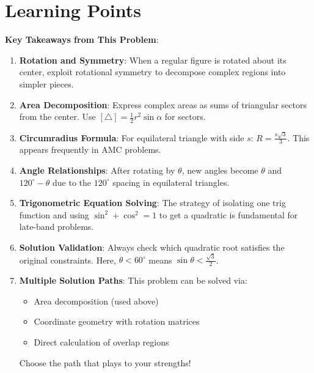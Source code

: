 \documentclass[12pt]{article}
\begin{document}
\section*{Learning Points}

\textbf{Key Takeaways from This Problem}:

\begin{enumerate}
    \item \textbf{Rotation and Symmetry}: When a regular figure is rotated about its center, exploit rotational symmetry to decompose complex regions into simpler pieces.
    
    \item \textbf{Area Decomposition}: Express complex areas as sums of triangular sectors from the center. Use $[\triangle] = \frac{1}{2}r^2\sin\alpha$ for sectors.
    
    \item \textbf{Circumradius Formula}: For equilateral triangle with side $s$: $R = \frac{s\sqrt{3}}{3}$. This appears frequently in AMC problems.
    
    \item \textbf{Angle Relationships}: After rotating by $\theta$, new angles become $\theta$ and $120^{\circ} - \theta$ due to the $120^{\circ}$ spacing in equilateral triangles.
    
    \item \textbf{Trigonometric Equation Solving}: The strategy of isolating one trig function and using $\sin^2 + \cos^2 = 1$ to get a quadratic is fundamental for late-band problems.
    
    \item \textbf{Solution Validation}: Always check which quadratic root satisfies the original constraints. Here, $\theta < 60^{\circ}$ means $\sin\theta < \frac{\sqrt{3}}{2}$.
    
    \item \textbf{Multiple Solution Paths}: This problem can be solved via:
    \begin{itemize}
        \item Area decomposition (used above)
        \item Coordinate geometry with rotation matrices
        \item Direct calculation of overlap regions
    \end{itemize}
    Choose the path that plays to your strengths!
\end{enumerate}

\vspace{0.5cm}
\end{document}
